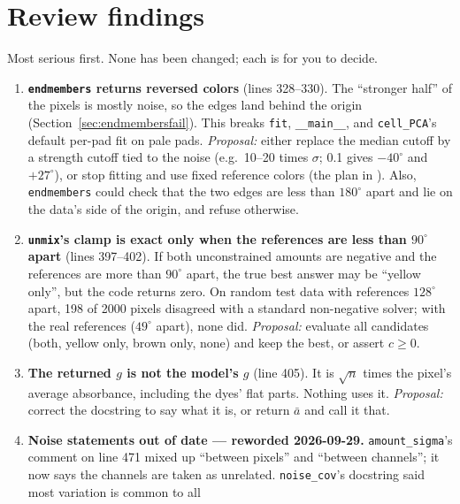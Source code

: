 \documentclass[11pt,letterpaper]{article}
\DeclareRobustCommand{\file}[1]{\texttt{\seqsplit{#1}}}
\newcommand{\code}[1]{\texttt{#1}}
\begin{document}
\section{Review findings}
\label{sec:findings}

Most serious first.  None has been changed; each is for you to decide.

\begin{enumerate}[label=\textbf{F\arabic*}, leftmargin=2.4em]
\item \textbf{\code{endmembers} returns reversed colors} (lines 328--330).
  The ``stronger half'' of the pixels is mostly noise, so the edges land
  behind the origin (Section~\ref{sec:endmembersfail}).  This breaks
  \code{fit}, \code{\_\_main\_\_}, and \code{cell\_PCA}'s default per-pad
  fit on pale pads.  \emph{Proposal:} either replace the median cutoff by a
  strength cutoff tied to the noise (e.g.\ 10--20 times $\sigma$; 0.1 gives
  $-40^\circ$ and $+27^\circ$), or stop fitting and use fixed reference
  colors (the plan in \file{pca\_study}).  Also, \code{endmembers} could
  check that the two edges are less than $180^\circ$ apart and lie on the
  data's side of the origin, and refuse otherwise.
\item \textbf{\code{unmix}'s clamp is exact only when the references are less
  than $90^\circ$ apart} (lines 397--402).  If both unconstrained amounts
  are negative and the references are more than $90^\circ$ apart, the true
  best answer may be ``yellow only'', but the code returns zero.  On random
  test data with references $128^\circ$ apart, 198 of 2000 pixels disagreed
  with a standard non-negative solver; with the real references ($49^\circ$
  apart), none did.  \emph{Proposal:} evaluate all candidates (both, yellow
  only, brown only, none) and keep the best, or assert $c \ge 0$.
\item \textbf{The returned $g$ is not the model's $g$} (line 405).  It is
  $\sqrt n$ times the pixel's average absorbance, including the dyes' flat
  parts.  Nothing uses it.  \emph{Proposal:} correct the docstring to say
  what it is, or return $\bar a$ and call it that.
\item \textbf{Noise statements out of date --- reworded 2026-09-29.}
  \code{amount\_sigma}'s comment on line 471 mixed up ``between pixels'' and
  ``between channels''; it now says the channels are taken as unrelated.
  \code{noise\_cov}'s docstring said most variation is common to all

\end{enumerate}
\end{document}
